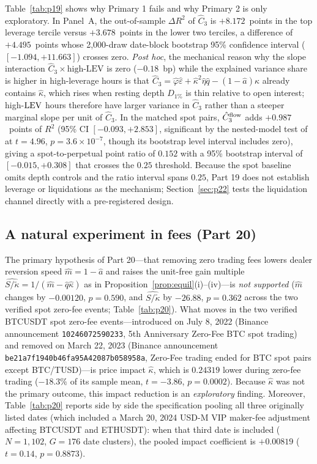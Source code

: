 \documentclass[12pt]{article}
\theoremstyle{definition}
\theoremstyle{remark}
\begin{document}
Table~\ref{tab:p19} shows why Primary 1 fails and why Primary 2 is only exploratory. In Panel~A, the out-of-sample $\Delta R^2$ of $\hat C_3$ is $+8.172$~points in the top leverage tercile versus $+3.678$~points in the lower two terciles, a difference of $+4.495$~points whose 2{,}000-draw date-block bootstrap 95\% confidence interval ($[-1.094,+11.663]$) crosses zero. \emph{Post hoc}, the mechanical reason why the slope interaction $\hat C_3\times\text{high-LEV}$ is zero ($-0.18$~bp) while the explained variance share is higher in high-leverage hours is that $\hat C_3=\hat\varphi\hat\varepsilon+\hat\kappa^2\hat\eta\hat q-(1-\hat a)\hat\kappa$ already contains $\hat\kappa$, which rises when resting depth $D_{1\%}$ is thin relative to open interest; high-${\rm LEV}$ hours therefore have larger variance in $\hat C_3$ rather than a steeper marginal slope per unit of $\hat C_3$. In the matched spot pairs, $\hat C_3^{\rm flow}$ adds $+0.987$~points of $R^2$ (95\% CI $[-0.093,+2.853]$, significant by the nested-model test of \citealp{clark2007} at $t=4.96$, $p=3.6\times10^{-7}$, though its bootstrap level interval includes zero), giving a spot-to-perpetual point ratio of $0.152$ with a 95\% bootstrap interval of $[-0.015,+0.308]$ that crosses the $0.25$ threshold. Because the spot baseline omits depth controls and the ratio interval spans $0.25$, Part 19 does not establish leverage or liquidations as the mechanism; Section~\ref{sec:p22} tests the liquidation channel directly with a pre-registered design.

\subsection{A natural experiment in fees (Part 20)}\label{sec:p20}
The primary hypothesis of Part 20---that removing zero trading fees lowers dealer reversion speed $\hat m=1-\hat a$ and raises the unit-free gain multiple $\widehat{S/\tilde\kappa}=1/(\hat m-\hat q\hat\kappa)$ as in Proposition~\ref{prop:equil}(i)--(iv)---is \emph{not supported} ($\hat m$ changes by $-0.00120$, $p=0.590$, and $\widehat{S/\tilde\kappa}$ by $-26.88$, $p=0.362$ across the two verified spot zero-fee events; Table~\ref{tab:p20}). What moves in the two verified BTCUSDT spot zero-fee events---introduced on July 8, 2022 (Binance announcement \texttt{10246072590233}, 5th Anniversary Zero-Fee BTC spot trading) and removed on March 22, 2023 (Binance announcement \texttt{be21a7f1940b46fa95A42087b058958a}, Zero-Fee trading ended for BTC spot pairs except BTC/TUSD)---is price impact $\hat\kappa$, which is $0.24319$ lower during zero-fee trading ($-18.3\%$ of its sample mean, $t=-3.86$, $p=0.0002$). Because $\hat\kappa$ was not the primary outcome, this impact reduction is an \emph{exploratory} finding. Moreover, Table~\ref{tab:p20} reports side by side the specification pooling all three originally listed dates (which included a March 20, 2024 USD-M VIP maker-fee adjustment affecting BTCUSDT and ETHUSDT): when that third date is included ($N=1{,}102$, $G=176$ date clusters), the pooled impact coefficient is $+0.00819$ ($t=0.14$, $p=0.8873$).
\end{document}

